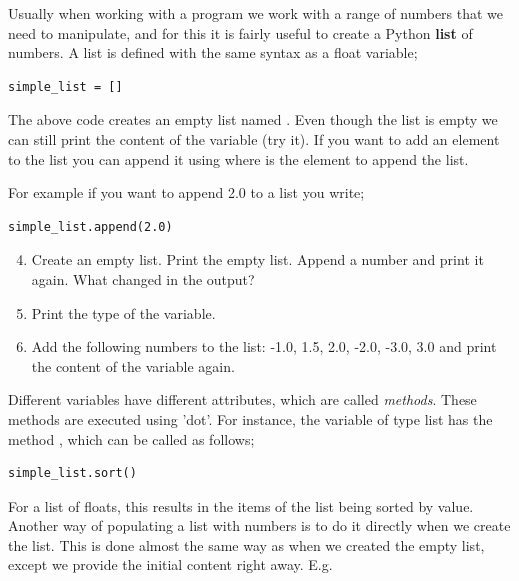 \documentclass{article}
\begin{document}
Usually when working with a program we work with a range of numbers
that we need to manipulate, and for this it is fairly useful to create a Python {\bf list}
of numbers.
A list is defined with the same syntax as a float variable;

\begin{lstlisting}
simple_list = []
\end{lstlisting}

The above code creates an empty list named .
Even though the list is empty we can still print
the content of the variable (try it).
If you want to add an element to the list you can
append it using  where  is the element to append the list.

For example if you want to append 2.0 to a list you write;

\begin{lstlisting}
simple_list.append(2.0)
\end{lstlisting}

\begin{enumerate}
  \setcounter{enumi}{3}
  \item Create an empty list.
    Print the empty list.
    Append a number and print it again.
    What changed in the output?

  \item Print the type of the variable.

  \item Add the following numbers to the list: -1.0, 1.5, 2.0, -2.0, -3.0, 3.0 and
    print the content of the variable again.
\end{enumerate}


Different variables have different attributes, which are called {\em methods}.
These methods are executed using 'dot'.
For instance,
the variable of type list has the method ,
which can be called as follows;

\begin{lstlisting}
simple_list.sort()
\end{lstlisting}

For a list of floats, this results in the items of the list being sorted by value.\\

Another way of populating a list with numbers is to do it directly when
we create the list.
This is done almost the same way as when we created the empty list, except we
provide the initial content right away. E.g.
\end{document}
